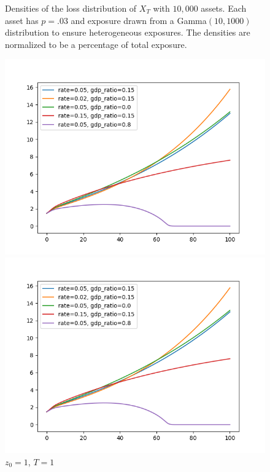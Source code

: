 \documentclass[12pt]{article}
\theoremstyle{definition}
\begin{document}
\begin{figure}[htb]
\begin{framed}
Densities of the loss distribution of \(X_T\) with \(10,000\) assets.  Each asset has \(p=.03\) and exposure drawn from a Gamma\((10, 1000)\) distribution to ensure heterogeneous exposures. The densities are normalized to be a percentage of total exposure. \newline
\begin{minipage}[t]{.48\textwidth}
\centering
\includegraphics[width=1\textwidth]{output_per_labor_100}
\caption{\(\alpha=.3\), \(\sigma=.5\), \(\lambda=0\), \(q=0\).  \label{fig5}}
\end{minipage}\hfill
\begin{minipage}[t]{.48\textwidth}
\centering
\includegraphics[width=1\textwidth]{output_per_labor_100}
\caption{\(z_0=1\), \(T=1\)  \label{fig6}}
\end{minipage}\hfill
\end{framed}
\end{figure}
\end{document}

